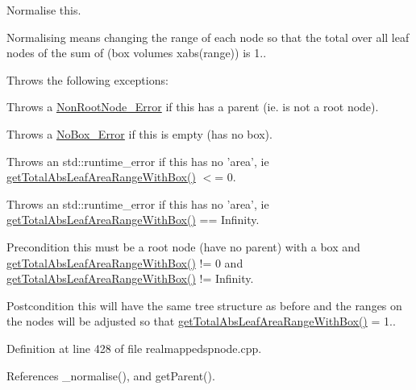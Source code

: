 \-Normalise this. 

\-Normalising means changing the range of each node so that the total over all leaf nodes of the sum of (box volumes xabs(range)) is 1..

\-Throws the following exceptions\-: 
\begin{DoxyItemize}
\item \-Throws a \hyperlink{classsubpavings_1_1NonRootNode__Error}{\-Non\-Root\-Node\-\_\-\-Error} if this has a parent (ie. is not a root node). 
\item \-Throws a \hyperlink{classsubpavings_1_1NoBox__Error}{\-No\-Box\-\_\-\-Error} if this is empty (has no box). 
\item \-Throws an std\-::runtime\-\_\-error if this has no 'area', ie \hyperlink{classsubpavings_1_1RealMappedSPnode_a972c5dbc0bedd9cad3af4f2af43be277}{get\-Total\-Abs\-Leaf\-Area\-Range\-With\-Box()} $<$= 0. 
\item \-Throws an std\-::runtime\-\_\-error if this has no 'area', ie \hyperlink{classsubpavings_1_1RealMappedSPnode_a972c5dbc0bedd9cad3af4f2af43be277}{get\-Total\-Abs\-Leaf\-Area\-Range\-With\-Box()} == \-Infinity. 
\end{DoxyItemize}

\begin{DoxyPrecond}{\-Precondition}
this must be a root node (have no parent) with a box and \hyperlink{classsubpavings_1_1RealMappedSPnode_a972c5dbc0bedd9cad3af4f2af43be277}{get\-Total\-Abs\-Leaf\-Area\-Range\-With\-Box()} != 0 and \hyperlink{classsubpavings_1_1RealMappedSPnode_a972c5dbc0bedd9cad3af4f2af43be277}{get\-Total\-Abs\-Leaf\-Area\-Range\-With\-Box()} != \-Infinity. 
\end{DoxyPrecond}
\begin{DoxyPostcond}{\-Postcondition}
this will have the same tree structure as before and the ranges on the nodes will be adjusted so that \hyperlink{classsubpavings_1_1RealMappedSPnode_a972c5dbc0bedd9cad3af4f2af43be277}{get\-Total\-Abs\-Leaf\-Area\-Range\-With\-Box()} = 1.. 
\end{DoxyPostcond}


\-Definition at line 428 of file realmappedspnode.\-cpp.



\-References \-\_\-normalise(), and get\-Parent().


